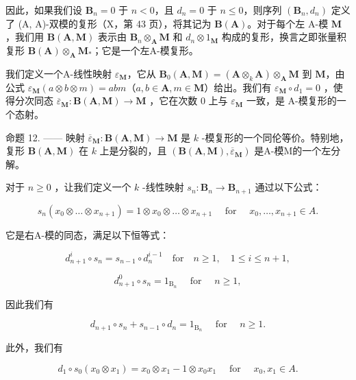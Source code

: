 因此，如果我们设 \(\mathbf{B}_n = 0\) 于 \(n < 0\)，且 \(d_n = 0\) 于 \(n \leqslant 0\)，则序列 \((\mathbf{B}_n, d_n)\) 定义了 (A, A)-双模的复形（X，第 43 页），将其记为 \(\mathbf{B}(\mathbf{A})\)。对于每个左 A-模 \(\mathbf{M}\)，我们用 \(\mathbf{B}(\mathbf{A}, \mathbf{M})\) 表示由 \(\mathbf{B}_n \otimes_{\mathbf{A}} \mathbf{M}\) 和 \(d_n \otimes 1_{\mathbf{M}}\) 构成的复形，换言之即张量积复形 \(\mathbf{B}(\mathbf{A}) \otimes_{\mathbf{A}} \mathbf{M}_{*}\)；它是一个左A-模复形。

我们定义一个A-线性映射 \(\varepsilon_{\mathbf{M}}\)，它从 \(\mathbf{B}_{0}(\mathbf{A},\mathbf{M}) = (\mathbf{A}\otimes_{k}\mathbf{A})\otimes_{\mathbf{A}}\mathbf{M}\) 到 \(\mathbf{M}\)，由公式 \(\varepsilon_{\mathbf{M}}(a\otimes b\otimes m) = abm\)（\(a,b\in \mathbf{A},m\in \mathbf{M}\)）给出。我们有 \(\varepsilon_{\mathbf{M}}\circ d_1 = 0\) ，使得分次同态 \(\overline{\varepsilon}_{\mathbf{M}}:\mathbf{B}(\mathbf{A},\mathbf{M})\to \mathbf{M}\) ，它在次数 0 上与 \(\varepsilon_{\mathbf{M}}\) 一致，是 A-模复形的一个态射。

命题 12. —— 映射 \(\overline{\varepsilon}_{\mathbf{M}}: \mathbf{B}(\mathbf{A}, \mathbf{M}) \to \mathbf{M}\) 是 \(k\) -模复形的一个同伦等价。特别地，复形 \(\mathbf{B}(\mathbf{A}, \mathbf{M})\) 在 \(k\) 上是分裂的，且 \((\mathbf{B}(\mathbf{A}, \mathbf{M}), \overline{\varepsilon}_{\mathbf{M}})\) 是A-模M的一个左分解。

对于 \(n \geqslant 0\) ，让我们定义一个 \(k\) -线性映射 \(s_n: \mathbf{B}_n \to \mathbf{B}_{n+1}\) 通过以下公式：

\[
s _ {n} \left(x _ {0} \otimes \dots \otimes x _ {n + 1}\right) = 1 \otimes x _ {0} \otimes \dots \otimes x _ {n + 1} \quad \text { for } \quad x _ {0}, \dots , x _ {n + 1} \in A.
\]

它是右A-模的同态，满足以下恒等式：

\[
d _ {n + 1} ^ {i} \circ s _ {n} = s _ {n - 1} \circ d _ {n} ^ {i - 1} \quad \mathrm{for} \quad n \geqslant 1, \quad 1 \leqslant i \leqslant n + 1,
\]

\[
d _ {n + 1} ^ {0} \circ s _ {n} = 1 _ {\mathrm{B} _ {n}} \quad \text { for } \quad n \geqslant 1,
\]

因此我们有

\[
d _ {n + 1} \circ s _ {n} + s _ {n - 1} \circ d _ {n} = 1 _ {\mathrm{B} _ {n}} \quad \text { for } \quad n \geqslant 1.\tag{16}
\]

此外，我们有

\[
d _ {1} \circ s _ {0} (x _ {0} \otimes x _ {1}) = x _ {0} \otimes x _ {1} - 1 \otimes x _ {0} x _ {1} \quad \text { for } \quad x _ {0}, x _ {1} \in A.\tag{17}
\]

